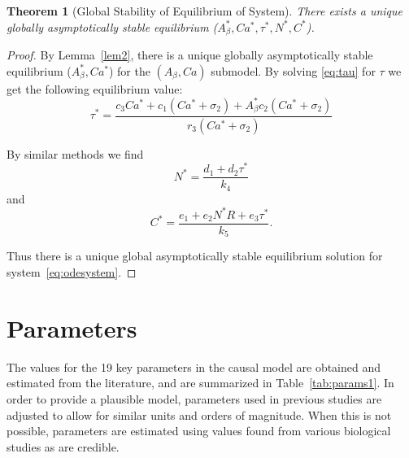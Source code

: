 \documentclass[12pt]{article}
\newtheorem{thm}{Theorem}
\theoremstyle{definition}
\begin{document}
\begin{thm}[Global Stability of Equilibrium of System]
    There exists a unique globally asymptotically stable equilibrium ($A _{\beta}^{*},Ca ^{*}, \tau ^{*}, N ^{*},C ^{*}$).
\end{thm}

\begin{proof}
    By Lemma~\ref{lem2}, there is a unique globally asymptotically stable equilibrium ($A _{\beta}^{*},Ca ^{*}$) for the $(A_\beta, Ca)$ submodel. By solving \eqref{eq:tau} for $\tau$ we get the following equilibrium value:
    \begin{equation*}
        \tau^{*} = \frac{c_3 Ca^* + c_1 (Ca^* + \sigma_2) + A_\beta^* c_2 (Ca^* + \sigma_2)}{r_3 (Ca^* + \sigma_2)}
    \end{equation*}

    By similar methods we find
    \begin{equation*}
        N^* = \frac{d_1 + d_2 \tau^*}{k_4}
    \end{equation*}
    and
    \begin{equation*}
        C^* = \frac{e_1 + e_2 N^*R + e_3 \tau^*}{k_5}.
    \end{equation*}

    Thus there is a unique global asymptotically stable equilibrium solution for system~\eqref{eq:odesystem}.
\end{proof} \bigskip

\section{Parameters}
The values for the 19 key parameters in the causal model are obtained and estimated from the literature, and are summarized in Table~\ref{tab:params1}. In order to provide a plausible model, parameters used in previous studies are adjusted to allow for similar units and orders of magnitude. When this is not possible, parameters are estimated using values found from various biological studies as are credible.
\end{document}
